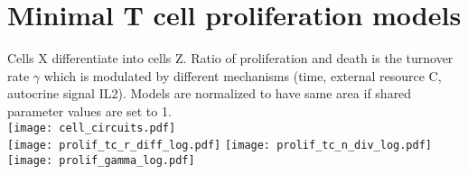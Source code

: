 \documentclass[12pt,a4paper]{article}
\begin{document}
\section*{Minimal T cell proliferation models}
Cells X differentiate into cells Z. Ratio of proliferation and death is the turnover rate $\gamma$ which is modulated by different mechanisms (time, external resource C, autocrine signal IL2). Models are normalized to have same area if shared parameter values are set to 1.\\
\texttt{[image: cell\_circuits.pdf]}\\
\texttt{[image: prolif\_tc\_r\_diff\_log.pdf]}
\texttt{[image: prolif\_tc\_n\_div\_log.pdf]}
\texttt{[image: prolif\_gamma\_log.pdf]}
\end{document}
